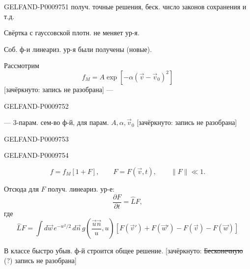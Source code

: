 \begin{GelfandAdjacentEvidence}{GELFAND-P000975}{1}
получ. точные решения, беск. число законов сохранения и т.д.

Свёртка с гауссовской плотн. не меняет ур-я.

Соб. ф-и линеариз. ур-я были получены (новые).

Рассмотрим
\begin{equation*}
 f_M=A\exp[-\alpha(\vec v-\vec v_0)^2]
 \tag{5}
\end{equation*}
[зачёркнуто: запись не разобрана] --- 
\end{GelfandAdjacentEvidence}
\begin{GelfandAdjacentEvidence}{GELFAND-P000975}{2}


--- 3-парам. сем-во ф-й, для парам. $A,\alpha,\vec v_0$ [зачёркнуто: запись не разобрана]
\end{GelfandAdjacentEvidence}
\begin{GelfandAdjacentEvidence}{GELFAND-P000975}{3}

\end{GelfandAdjacentEvidence}
\begin{GelfandAdjacentEvidence}{GELFAND-P000975}{4}


\begin{equation*}
 f=f_M[1+F],\qquad F=F(\vec v,t),\qquad \|F\|\ll1.
 \tag{6}
\end{equation*}

Отсюда для $F$ получ. линеариз. ур-е:
\begin{equation*}
 \frac{\partial F}{\partial t}=\widehat L F,
 \tag{7}
\end{equation*}
где
\begin{equation*}
 \widehat L F
 =\int d\vec w\,e^{-w^2/2}\,d\vec n\,
 g\left(\frac{\vec u\vec n}{u},u\right)
 [F(\vec v')+F(\vec w')-F(\vec v)-F(\vec w)]
 \tag{8}
\end{equation*}

В классе быстро убыв. ф-й строится общее решение. [зачёркнуто: \sout{Бесконечную} (?) запись не разобрана]
\end{GelfandAdjacentEvidence}
